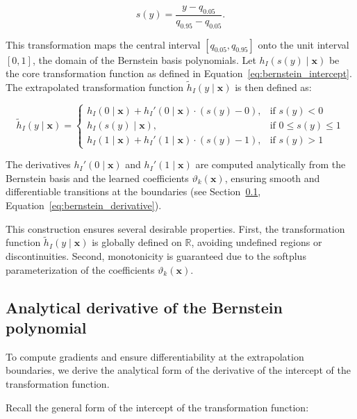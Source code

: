 \begin{equation}
s(y) = \frac{y - q_{0.05}}{q_{0.95} - q_{0.05}}.
\label{eq:scale}
\end{equation}

This transformation maps the central interval $[q_{0.05}, q_{0.95}]$ onto the unit interval $[0, 1]$, the domain of the Bernstein basis polynomials. Let $h_I(s(y) \mid \mathbf{x})$ be the core transformation function as defined in Equation~\eqref{eq:bernstein_intercept}. The extrapolated transformation function $\tilde{h}_I(y \mid \mathbf{x})$ is then defined as:

\begin{equation}
\tilde{h}_I(y \mid \mathbf{x}) =
\begin{cases}
h_I(0 \mid \mathbf{x}) + h_I'(0 \mid \mathbf{x}) \cdot (s(y) - 0), & \text{if } s(y) < 0 \\
h_I(s(y) \mid \mathbf{x}), & \text{if } 0 \leq s(y) \leq 1 \\
h_I(1 \mid \mathbf{x}) + h_I'(1 \mid \mathbf{x}) \cdot (s(y) - 1), & \text{if } s(y) > 1
\end{cases}
\label{eq:extended_bernstein}
\end{equation}

The derivatives $h_I'(0 \mid \mathbf{x})$ and $h_I'(1 \mid \mathbf{x})$ are computed analytically from the Bernstein basis and the learned coefficients $\vartheta_k(\mathbf{x})$, ensuring smooth and differentiable transitions at the boundaries (see Section~\ref{sec:analytical_derivative_bernstein}, Equation~\ref{eq:bernstein_derivative}).

This construction ensures several desirable properties. First, the transformation function $\tilde{h}_I(y \mid \mathbf{x})$ is globally defined on $\mathbb{R}$, avoiding undefined regions or discontinuities. Second, monotonicity is guaranteed due to the softplus parameterization of the coefficients $\vartheta_k(\mathbf{x})$.



\subsection{Analytical derivative of the Bernstein polynomial} \label{sec:analytical_derivative_bernstein}

To compute gradients and ensure differentiability at the extrapolation boundaries, we derive the analytical form of the derivative of the intercept of the transformation function.

Recall the general form of the intercept of the transformation function:

